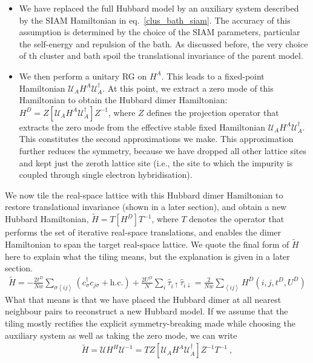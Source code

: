 \documentclass[12pt]{article}
\numberwithin{equation}{section}
\begin{document}
\begin{itemize}
	\item We have replaced the full Hubbard model by an auxiliary system described by the SIAM Hamiltonian in eq.~\ref{clus_bath_siam}. The accuracy of this assumption is determined by the choice of the SIAM parameters, particular the self-energy and repulsion of the bath. As discussed before, the very choice of th cluster and bath spoil the translational invariance of the parent model.
	\item We then perform a unitary RG on $H^A$. This leads to a fixed-point Hamiltonian $\mathcal{U}_A H^A \mathcal{U}_A^\dagger$. At this point, we extract a zero mode of this Hamiltonian to obtain the Hubbard dimer Hamiltonian: $H^D = Z\left[\mathcal{U}_A H^A \mathcal{U}_A^\dagger \right] Z^{-1}$, where $Z$ defines the projection operator that extracts the zero mode from the effective stable fixed Hamiltonian $\mathcal{U}_A H^A \mathcal{U}_A^\dagger$. This constitutes the second approximations we make. This approximation further reduces the symmetry, because we have dropped all other lattice sites and kept just the zeroth lattice site (i.e., the site to which the impurity is coupled through single electron hybridisation).
\end{itemize}
We now tile the real-space lattice with this Hubbard dimer Hamiltonian to restore translational invariance (shown in a later section), and obtain a new Hubbard Hamiltonian, $\tilde H = T\left[ H^{D} \right] T^{-1}$, where $T$ denotes the operator that performs the set of iterative real-space translations, and enables the dimer Hamiltonian to span the target real-space lattice. We quote the final form of $\tilde H$ here to explain what the tiling means, but the explanation is given in a later section.
\begin{equation}\begin{aligned}
	\tilde H = - \frac{2t^D}{Nw}\sum_{\sigma \left<ij \right>}\left(c^\dagger_{\sigma}c_{j\sigma} + \text{h.c.}\right) + \frac{2U^D}{N}\sum_i \hat \tau_{i \uparrow}\hat \tau_{i \downarrow} = \frac{2}{Nw}\sum_{\left<ij \right>} H^D(i,j,t^D, U^D)
\end{aligned}\end{equation}
What that means is that we have placed the Hubbard dimer at all nearest neighbour pairs to reconstruct a new Hubbard model. If we assume that the tiling mostly rectifies the explicit symmetry-breaking made while choosing the auxiliary system as well as taking the zero mode, we can write
\begin{equation}\begin{aligned}
	\label{app2}
	\tilde H = \mathcal{U} H^H \mathcal{U}^{-1} = TZ\left[\mathcal{U}_A H^A \mathcal{U}_A^\dagger \right]Z^{-1} T^{-1}~,
\end{aligned}\end{equation}
\end{document}
